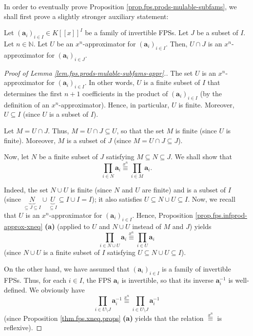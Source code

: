 \begin{fineprint}
In order to eventually prove Proposition \ref{prop.fps.prods-mulable-subfams},
we shall first prove a slightly stronger auxiliary statement:

\begin{lemma}
\label{lem.fps.prods-mulable-subfams-appr}Let $\left(  \mathbf{a}_{i}\right)
_{i\in I}\in K\left[  \left[  x\right]  \right]  ^{I}$ be a family of
invertible FPSs. Let $J$ be a subset of $I$. Let $n\in\mathbb{N}$. Let $U$ be
an $x^{n}$-approximator for $\left(  \mathbf{a}_{i}\right)  _{i\in I}$. Then,
$U\cap J$ is an $x^{n}$-approximator for $\left(  \mathbf{a}_{i}\right)
_{i\in J}$.
\end{lemma}

\begin{proof}
[Proof of Lemma \ref{lem.fps.prods-mulable-subfams-appr}.]The set $U$ is an
$x^{n}$-approximator for $\left(  \mathbf{a}_{i}\right)  _{i\in I}$. In other
words, $U$ is a finite subset of $I$ that determines the first $n+1$
coefficients in the product of $\left(  \mathbf{a}_{i}\right)  _{i\in I}$ (by
the definition of an $x^{n}$-approximator). Hence, in particular, $U$ is
finite. Moreover, $U\subseteq I$ (since $U$ is a subset of $I$).

Let $M=U\cap J$. Thus, $M=U\cap J\subseteq U$, so that the set $M$ is finite
(since $U$ is finite). Moreover, $M$ is a subset of $J$ (since $M=U\cap
J\subseteq J$).

Now, let $N$ be a finite subset of $J$ satisfying $M\subseteq N\subseteq J$.
We shall show that
\[
\prod_{i\in N}\mathbf{a}_{i}\overset{x^{n}}{\equiv}\prod_{i\in M}%
\mathbf{a}_{i}.
\]


Indeed, the set $N\cup U$ is finite (since $N$ and $U$ are finite) and is a
subset of $I$ (since $\underbrace{N}_{\subseteq J\subseteq I}\cup
\underbrace{U}_{\subseteq I}\subseteq I\cup I=I$); it also satisfies
$U\subseteq N\cup U\subseteq I$. Now, we recall that $U$ is an $x^{n}%
$-approximator for $\left(  \mathbf{a}_{i}\right)  _{i\in I}$. Hence,
Proposition \ref{prop.fps.infprod-approx-xneq} \textbf{(a)} (applied to $U$
and $N\cup U$ instead of $M$ and $J$) yields
\begin{equation}
\prod_{i\in N\cup U}\mathbf{a}_{i}\overset{x^{n}}{\equiv}\prod_{i\in
U}\mathbf{a}_{i} \label{pf.lem.fps.prods-mulable-subfams-appr.ab}%
\end{equation}
(since $N\cup U$ is a finite subset of $I$ satisfying $U\subseteq N\cup
U\subseteq I$).

On the other hand, we have assumed that $\left(  \mathbf{a}_{i}\right)  _{i\in
I}$ is a family of invertible FPSs. Thus, for each $i\in I$, the FPS
$\mathbf{a}_{i}$ is invertible, so that its inverse $\mathbf{a}_{i}^{-1}$ is
well-defined. We obviously have%
\begin{equation}
\prod_{i\in U\setminus J}\mathbf{a}_{i}^{-1}\overset{x^{n}}{\equiv}\prod_{i\in
U\setminus J}\mathbf{a}_{i}^{-1}
\label{pf.lem.fps.prods-mulable-subfams-appr.cd}%
\end{equation}
(since Proposition \ref{thm.fps.xneq.props} \textbf{(a)} yields that the
relation $\overset{x^{n}}{\equiv}$ is reflexive).


\end{proof}
\end{fineprint}

